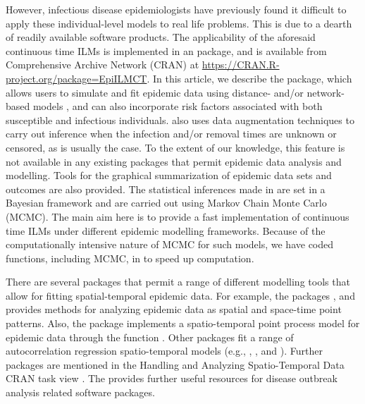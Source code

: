 \documentclass[nojss,shortnames]{jss}
\begin{document}
However, infectious disease epidemiologists have previously found it difficult to apply these individual-level models to real life problems. This is due to a dearth of readily available software products. The applicability of the aforesaid continuous time ILMs is implemented in an  \citep{CRAN} package,  \citep{EpiILMCT} and is available from Comprehensive  Archive Network (CRAN) at \url{https://CRAN.R-project.org/package=EpiILMCT}. In this article, we describe the package,  which allows users to simulate and fit epidemic data using distance- and/or network-based models \citep{bifolchi2013spatial,deardon2010inference,jewell2009bayesian}, and can also incorporate risk factors associated with both susceptible and infectious individuals.  also uses data augmentation techniques to carry out inference when the infection and/or removal times are unknown or censored, as is usually the case. To the extent of our knowledge, this feature is not available in any existing  packages that permit epidemic data analysis and modelling. Tools for the graphical summarization of epidemic data sets and outcomes are also provided. The statistical inferences made in  are set in a Bayesian framework and are carried out using Markov Chain Monte Carlo (MCMC). The main aim here is to provide a fast implementation of continuous time ILMs under different epidemic modelling frameworks. Because of the computationally intensive nature of MCMC for such models, we have coded functions, including MCMC, in  to speed up computation. 

There are several  packages that permit a range of different modelling tools that allow for fitting spatial-temporal epidemic data. 
For example, the packages  \citep{splancs}, and  \citep{lgcp1,lgcp2} provides methods for analyzing epidemic data as spatial and space-time point patterns. Also, the package  \citep{surveillance2} implements a spatio-temporal point process model for epidemic data through the function . Other packages fit a range of autocorrelation regression spatio-temporal models (e.g.,  \citep{JSSCARBayesST},  \citep{bivandcomparing1,bivandcomparing2}, and  \citep{spTimer,JSSspTimer}). Further packages are mentioned in the Handling and Analyzing Spatio-Temporal Data CRAN task view \citep{Pebesma}. The \citet{RECON} provides further useful resources for disease outbreak analysis related  software packages. 
\end{document}
